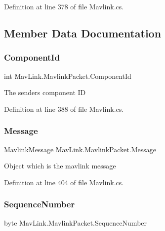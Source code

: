Definition at line 378 of file Mavlink.\+cs.



\subsection{Member Data Documentation}
\mbox{\label{classMavLink_1_1MavlinkPacket_a757b10451bbb36de712e50898097ce76}} 
\subsubsection{\texorpdfstring{ComponentId}{ComponentId}}
{\footnotesize\ttfamily int Mav\+Link.\+Mavlink\+Packet.\+Component\+Id}



The sender\textquotesingle{}s component ID 



Definition at line 388 of file Mavlink.\+cs.

\mbox{\label{classMavLink_1_1MavlinkPacket_addf815b76e6685627f91584450130035}} 
\subsubsection{\texorpdfstring{Message}{Message}}
{\footnotesize\ttfamily Mavlink\+Message Mav\+Link.\+Mavlink\+Packet.\+Message}



Object which is the mavlink message 



Definition at line 404 of file Mavlink.\+cs.

\mbox{\label{classMavLink_1_1MavlinkPacket_a02bc9d9153a2b3df8e343488c78bfe9d}} 
\subsubsection{\texorpdfstring{SequenceNumber}{SequenceNumber}}
{\footnotesize\ttfamily byte Mav\+Link.\+Mavlink\+Packet.\+Sequence\+Number}



